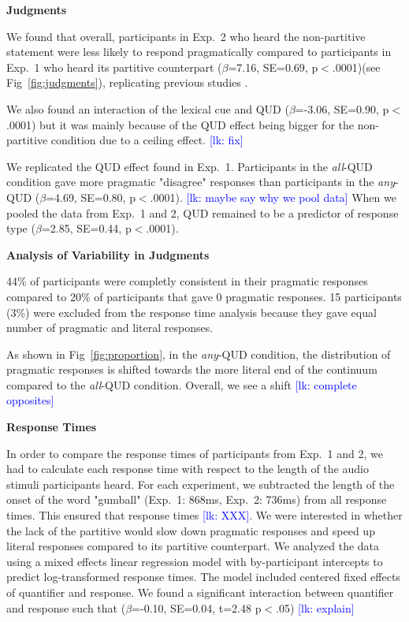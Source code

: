 \documentclass[10pt,letterpaper]{article}
\newcommand{\lk}[1]{\textcolor{Blue}{[lk: #1]}}
\begin{document}
\noindent \textbf{Judgments}

We found that overall, participants in Exp.~2 who heard the non-partitive statement were less likely to respond pragmatically compared to participants in Exp.~1 who heard its partitive counterpart ($\beta$=7.16, SE=0.69, p$<$.0001)(see Fig~\ref{fig:judgments}), replicating previous studies \cite{DegenTanenhaus2015,Degen2015}.

We also found an interaction of the lexical cue and QUD ($\beta$=-3.06, SE=0.90, p$<$.0001) but it was mainly because of the QUD effect being bigger for the non-partitive condition due to a ceiling effect. \lk{fix}

We replicated the QUD effect found in Exp.~1. Participants in the \textit{all}-QUD condition gave more pragmatic "disagree" responses than participants in the \textit{any}-QUD ($\beta$=4.69, SE=0.80, p$<$.0001). \lk{maybe say why we pool data} When we pooled the data from Exp.~1 and 2, QUD remained to be a predictor of response type ($\beta$=2.85, SE=0.44, p$<$.0001).

\noindent \textbf{Analysis of Variability in Judgments}

44\% of participants were completly consistent in their pragmatic responses compared to 20\% of participants that gave 0 pragmatic responses. 15 participants (3\%) were excluded from the response time analysis because they gave equal number of pragmatic and literal responses.

As shown in Fig~\ref{fig:proportion}, in the \emph{any}-QUD condition, the distribution of pragmatic responses is shifted towards the more literal end of the continuum compared to the \emph{all}-QUD condition. Overall, we see a shift \lk{complete opposites}

\noindent \textbf{Response Times}

In order to compare the response times of participants from Exp.~1 and 2, we had to calculate each response time with respect to the length of the audio stimuli participants heard. For each experiment, we subtracted the length of the onset of the word "gumball" (Exp.~1: 868ms, Exp.~2: 736ms) from all response times. This ensured that response times \lk{XXX}. We were interested in whether the lack of the partitive would slow down pragmatic responses and speed up literal responses compared to its partitive counterpart. We analyzed the data using a mixed effects linear regression model with by-participant intercepts to predict log-transformed response times. The model included centered fixed effects of quantifier and response. We found a significant interaction between quantifier and response such that ($\beta$=-0.10, SE=0.04, t=2.48 p$<$.05) \lk{explain}
\end{document}
